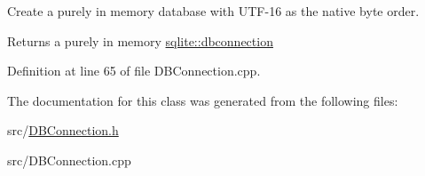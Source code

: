Create a purely in memory database with U\-T\-F-\/16 as the native byte order. 

\begin{DoxyReturn}{Returns}
a purely in memory \hyperlink{a00004}{sqlite\-::dbconnection} 
\end{DoxyReturn}


Definition at line 65 of file D\-B\-Connection.\-cpp.



The documentation for this class was generated from the following files\-:\begin{DoxyCompactItemize}
\item 
src/\hyperlink{a00022}{D\-B\-Connection.\-h}\item 
src/D\-B\-Connection.\-cpp\end{DoxyCompactItemize}
